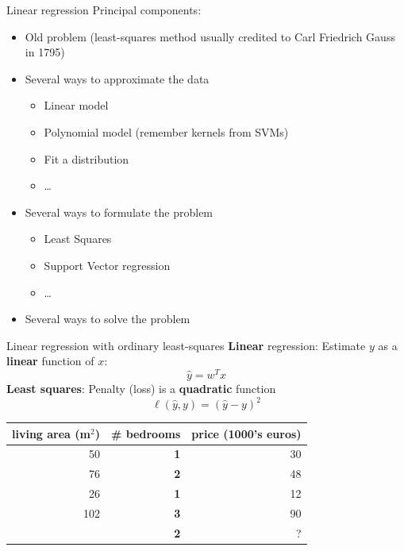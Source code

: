 \documentclass{beamer}
\begin{document}
\begin{frame}{Linear regression}
Principal components:
\begin{itemize}
	\item Old problem (least-squares method usually credited to Carl Friedrich Gauss in 1795)
	\item Several ways to approximate the data
	\begin{itemize}
		\item Linear model
		\item Polynomial model (remember kernels from SVMs)
		\item Fit a distribution
		\item \ldots
	\end{itemize}
	\item Several ways to formulate the problem
	\begin{itemize}
		\item Least Squares
		\item Support Vector regression
		\item \ldots
	\end{itemize}
	\item Several ways to solve the problem
\end{itemize}
\end{frame}

\begin{frame}{Linear regression with ordinary least-squares}
\textbf{Linear} regression: Estimate $y$ as a \textbf{linear} function of $x$:
$$ \hat{y} = w^T x$$
\vfill
\textbf{Least squares}: Penalty (loss) is a \textbf{quadratic} function
$$ \ell \left( \hat{y}, y \right) = \left( \hat{y} - y\right)^2$$
\end{frame}

\begin{frame}%

\begin{table}
\centering
\begin{tabular}{r|r|r}
living area (m$^2$) &  \textbf{\# bedrooms} & price (1000's euros) \\\hline
50 & \textbf{1} & 30\\
76 & \textbf{2} & 48\\
26 & \textbf{1} & 12\\
102 & \textbf{3} & 90\\
\pause
61 & \textbf{2} & ?
\end{tabular}
\end{table}

\end{frame}
\end{document}
